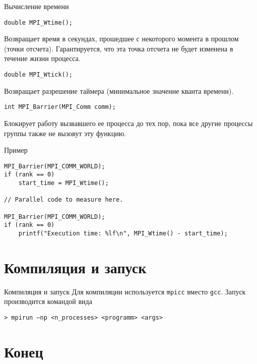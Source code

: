 \begin{frame}[fragile]{Вычисление времени}
\begin{lstlisting}
double MPI_Wtime();
\end{lstlisting}

Возвращает время в секундах, прошедшее с  некоторого момента в прошлом (точки отсчета). Гарантируется, что эта точка отсчета не будет изменена в течение жизни процесса.

\begin{lstlisting}
double MPI_Wtick();
\end{lstlisting}

Возвращает разрешение таймера (минимальное значение кванта времени).

\begin{lstlisting}
int MPI_Barrier(MPI_Comm comm);
\end{lstlisting}

Блокирует работу вызвавшего ее процесса до тех пор, пока все другие процессы группы также не вызовут эту функцию.
\end{frame}

\begin{frame}[fragile]{Пример}
\begin{lstlisting}[basicstyle=\scriptsize]
MPI_Barrier(MPI_COMM_WORLD);
if (rank == 0)
    start_time = MPI_Wtime();

// Parallel code to measure here.

MPI_Barrier(MPI_COMM_WORLD);
if (rank == 0)
    printf("Execution time: %lf\n", MPI_Wtime() - start_time);
\end{lstlisting}
\end{frame}

\section{Компиляция и запуск}

\begin{frame}[fragile]{Компиляция и запуск}
Для компиляции используется \texttt{mpicc} вместо \texttt{gcc}.
\vfill
Запуск производится командой вида

\begin{lstlisting}
> mpirun –np <n_processes> <programm> <args>
\end{lstlisting}
\end{frame}

\section*{Конец}

